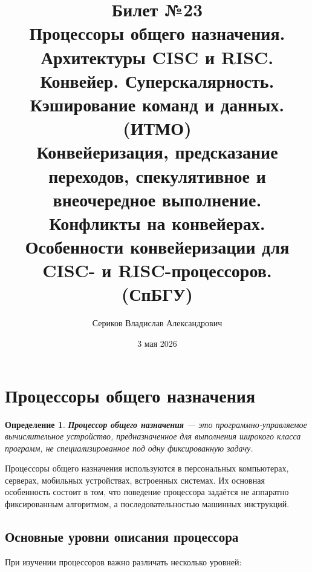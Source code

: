 \documentclass[12pt,a4paper]{article}
\title{Билет №23 \\ \small Процессоры общего назначения. Архитектуры CISC и RISC. Конвейер. Суперскалярность. Кэширование команд и данных. (ИТМО) \\ Конвейеризация, предсказание переходов, спекулятивное и внеочередное выполнение. Конфликты на конвейерах. Особенности конвейеризации для CISC- и RISC-процессоров. (СпБГУ)}
\author{Сериков Владислав Александрович}
\date{3 мая 2026}
\newtheorem{definition}{Определение}
\begin{document}
\maketitle
\tableofcontents
\newpage

\section{Процессоры общего назначения}

\begin{definition}
\textbf{Процессор общего назначения} --- это программно-управляемое вычислительное устройство, предназначенное для выполнения широкого класса программ, не специализированное под одну фиксированную задачу.
\end{definition}

Процессоры общего назначения используются в персональных компьютерах, серверах, мобильных устройствах, встроенных системах. Их основная особенность состоит в том, что поведение процессора задаётся не аппаратно фиксированным алгоритмом, а последовательностью машинных инструкций.

\subsection{Основные уровни описания процессора}

При изучении процессоров важно различать несколько уровней:
\end{document}
